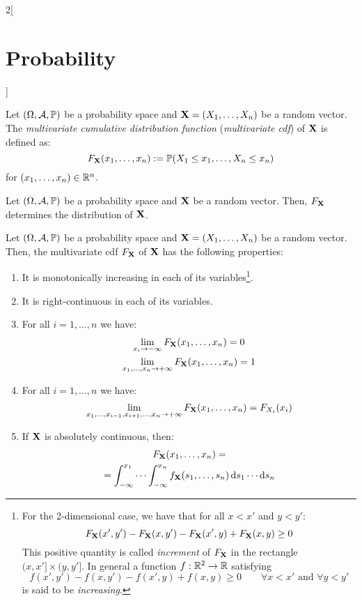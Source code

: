 \documentclass[../../../main.tex]{subfiles}
\begin{document}
\begin{multicols}{2}[\section{Probability}]
\begin{definition}
  \end{definition}
  \begin{definition}
    Let $(\Omega,\mathcal{A},\mathbb{P})$ be a probability space and $\boldsymbol{\mathrm{X}}=(X_1,\ldots,X_n)$ be a random vector. The \emph{multivariate cumulative distribution function} (\emph{multivariate cdf}) of $\boldsymbol{\mathrm{X}}$ is defined as: $$F_{\boldsymbol{\mathrm{X}}}(x_1,\ldots,x_n):=\mathbb{P}(X_1\leq x_1,\ldots,X_n\leq x_n)$$ for $(x_1,\ldots,x_n)\in\mathbb{R}^n$.
  \end{definition}
  \begin{theorem}
    Let $(\Omega,\mathcal{A},\mathbb{P})$ be a probability space and $\boldsymbol{\mathrm{X}}$ be a random vector. Then, $F_{\boldsymbol{\mathrm{X}}}$ determines the distribution of $\boldsymbol{\mathrm{X}}$.
  \end{theorem}
  \begin{proposition}
    Let $(\Omega,\mathcal{A},\mathbb{P})$ be a probability space and $\boldsymbol{\mathrm{X}}=(X_1,\ldots,X_n)$ be a random vector. Then, the multivariate cdf $F_{\boldsymbol{\mathrm{X}}}$ of $\boldsymbol{\mathrm{X}}$ has the following properties:
    \begin{enumerate}
      \item It is monotonically increasing in each of its variables\footnote{For the 2-dimensional case, we have that for all $x<x'$ and $y<y'$: $$F_{\boldsymbol{\mathrm{X}}}(x',y')-F_{\boldsymbol{\mathrm{X}}}(x,y')-F_{\boldsymbol{\mathrm{X}}}(x',y)+F_{\boldsymbol{\mathrm{X}}}(x,y)\geq 0$$ This positive quantity is called \emph{increment} of $F_{\boldsymbol{\mathrm{X}}}$ in the rectangle $(x,x']\times(y,y']$. In general a function $f:\mathbb{R}^2\rightarrow\mathbb{R}$ satisfying $$f(x',y')-f(x,y')-f(x',y)+f(x,y)\geq 0\qquad\forall x<x'\text{ and }\forall y<y'$$ is said to be \emph{increasing}.}.
      \item It is right-continuous in each of its variables.
      \item For all $i=1,\ldots,n$ we have:
            \begin{gather*}
              \lim_{x_i\to-\infty}F_{\boldsymbol{\mathrm{X}}}(x_1,\ldots,x_n)=0\\
              \lim_{x_1,\ldots,x_n\to+\infty}F_{\boldsymbol{\mathrm{X}}}(x_1,\ldots,x_n)=1
            \end{gather*}
      \item For all $i=1,\ldots,n$ we have: $$\lim_{x_1,\ldots,x_{i-1},x_{i+1},\ldots,x_n\to+\infty}F_{\boldsymbol{\mathrm{X}}}(x_1,\ldots,x_n)=F_{X_i}(x_i)$$
      \item If $\boldsymbol{\mathrm{X}}$ is absolutely continuous, then:
            \begin{multline*}
              F_{\vf{X}}(x_1,\ldots,x_n)=\\=\int_{-\infty}^{x_1}\cdots\int_{-\infty}^{x_n} f_{\vf{X}}(s_1,\ldots,s_n)\dd{s}_1\cdots\dd{s}_n

\end{multline*}
\end{enumerate}
\end{proposition}
\end{multicols}
\end{document}
